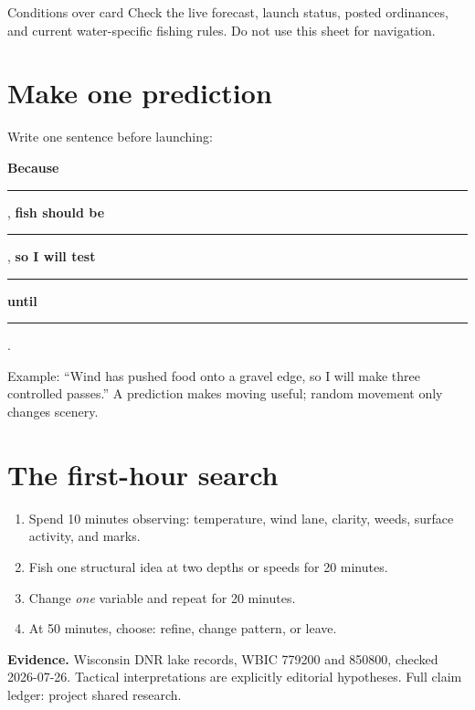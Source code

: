 \begin{teloshazard}{Conditions over card}
Check the live forecast, launch status, posted ordinances, and current
water-specific fishing rules. Do not use this sheet for navigation.
\end{teloshazard}

\section{Make one prediction}
Write one sentence before launching:
\begin{telosframe}
\textbf{Because} \rule{0.28\linewidth}{0.4pt}, \textbf{fish should be}
\rule{0.24\linewidth}{0.4pt}, \textbf{so I will test}
\rule{0.24\linewidth}{0.4pt} \textbf{until} \rule{0.15\linewidth}{0.4pt}.
\end{telosframe}

Example: ``Wind has pushed food onto a gravel edge, so I will make three
controlled passes.'' A prediction makes moving useful; random movement only
changes scenery.

\section{The first-hour search}
\begin{enumerate}
\item Spend 10 minutes observing: temperature, wind lane, clarity, weeds,
surface activity, and marks.
\item Fish one structural idea at two depths or speeds for 20 minutes.
\item Change \emph{one} variable and repeat for 20 minutes.
\item At 50 minutes, choose: refine, change pattern, or leave.
\end{enumerate}

{\footnotesize\textbf{Evidence.} Wisconsin DNR lake records, WBIC 779200 and
850800, checked 2026-07-26. Tactical interpretations are explicitly editorial
hypotheses. Full claim ledger: project shared research.}

